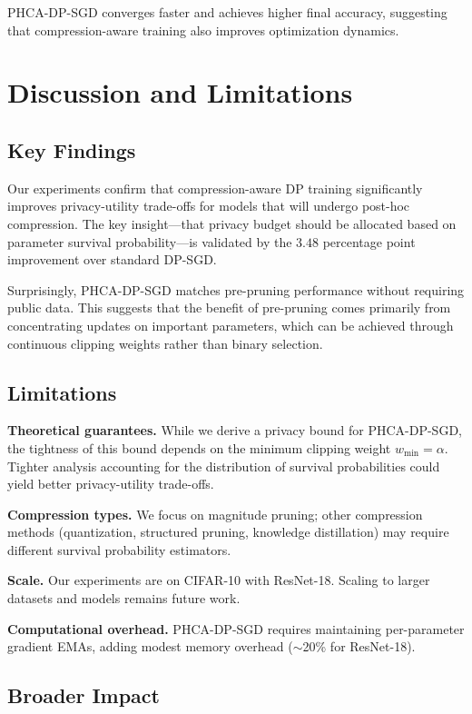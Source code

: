 \documentclass[11pt,a4paper]{article}
\begin{document}
PHCA-DP-SGD converges faster and achieves higher final accuracy, suggesting that compression-aware training also improves optimization dynamics.

\section{Discussion and Limitations}

\subsection{Key Findings}

Our experiments confirm that compression-aware DP training significantly improves privacy-utility trade-offs for models that will undergo post-hoc compression. The key insight---that privacy budget should be allocated based on parameter survival probability---is validated by the $3.48$ percentage point improvement over standard DP-SGD.

Surprisingly, PHCA-DP-SGD matches pre-pruning performance without requiring public data. This suggests that the benefit of pre-pruning comes primarily from concentrating updates on important parameters, which can be achieved through continuous clipping weights rather than binary selection.

\subsection{Limitations}

\textbf{Theoretical guarantees.} While we derive a privacy bound for PHCA-DP-SGD, the tightness of this bound depends on the minimum clipping weight $w_{\min} = \alpha$. Tighter analysis accounting for the distribution of survival probabilities could yield better privacy-utility trade-offs.

\textbf{Compression types.} We focus on magnitude pruning; other compression methods (quantization, structured pruning, knowledge distillation) may require different survival probability estimators.

\textbf{Scale.} Our experiments are on CIFAR-10 with ResNet-18. Scaling to larger datasets and models remains future work.

\textbf{Computational overhead.} PHCA-DP-SGD requires maintaining per-parameter gradient EMAs, adding modest memory overhead ($\sim$20\% for ResNet-18).

\subsection{Broader Impact}
\end{document}
